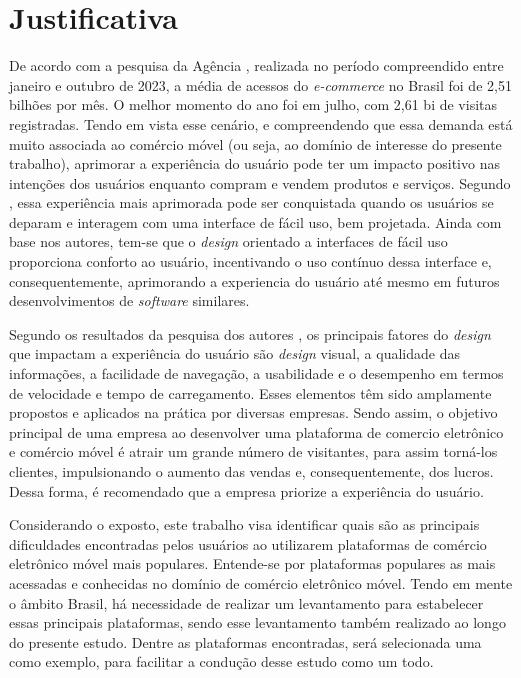 \section{Justificativa} \label{jus}
De acordo com a pesquisa da Agência , realizada no período compreendido entre janeiro e outubro de 2023, a média de acessos do \textit{e-commerce} no Brasil foi de 2,51 bilhões por mês. O melhor momento do ano foi em julho, com 2,61 bi de visitas registradas. Tendo em vista esse cenário, e compreendendo que essa demanda está muito associada ao comércio móvel (ou seja, ao domínio de interesse do presente trabalho), aprimorar a experiência do usuário pode ter um impacto positivo nas intenções dos usuários enquanto compram e vendem produtos e serviços. Segundo , essa experiência mais aprimorada pode ser conquistada quando os usuários se deparam e interagem com uma interface de fácil uso, bem projetada. Ainda com base nos autores, tem-se que o \textit{design} orientado a interfaces de fácil uso proporciona conforto ao usuário, incentivando o uso contínuo dessa interface e, consequentemente, aprimorando a experiencia do usuário até mesmo em futuros desenvolvimentos de \textit{software} similares.

Segundo os resultados da pesquisa dos autores , os principais fatores do \textit{design} que impactam a experiência do usuário são \textit{design} visual, a qualidade das informações, a facilidade de navegação, a usabilidade e o desempenho em termos de velocidade e tempo de carregamento. Esses elementos têm sido amplamente propostos e aplicados na prática por diversas empresas. Sendo assim, o objetivo principal de uma empresa ao desenvolver uma plataforma de comercio eletrônico e comércio móvel é atrair um grande número de visitantes, para assim torná-los clientes, impulsionando o aumento das vendas e, consequentemente, dos lucros. Dessa forma, é recomendado que a empresa priorize a experiência do usuário.

Considerando o exposto, este trabalho visa identificar quais são as principais dificuldades encontradas pelos usuários ao utilizarem plataformas de comércio eletrônico móvel mais populares. Entende-se por plataformas populares as mais acessadas e conhecidas no domínio de comércio eletrônico móvel. Tendo em mente o âmbito Brasil, há necessidade de realizar um levantamento para estabelecer essas principais plataformas, sendo esse levantamento também realizado ao longo do presente estudo. Dentre as plataformas encontradas, será selecionada uma como exemplo, para facilitar a condução desse estudo como um todo.

